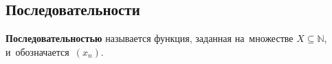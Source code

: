 \subsection{Последовательности}
\textbf{Последовательностью} называется функция, заданная на~множестве $X \subseteq \mathbb N$, и~обозначается~$(x_n)$.